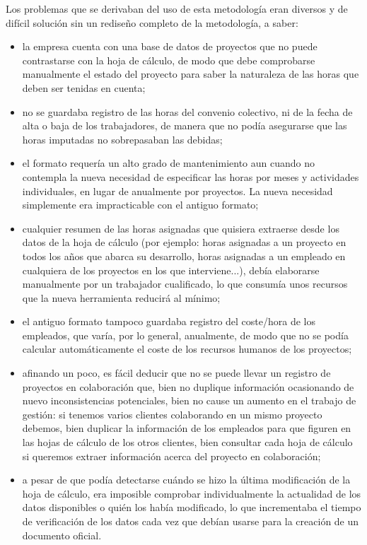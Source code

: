 Los problemas que se derivaban del uso de esta metodología eran diversos y de
difícil solución sin un rediseño completo de la metodología, a saber:
\begin{itemize}
\item la empresa cuenta con una base de datos de proyectos que no puede
contrastarse con la hoja de cálculo, de modo que debe comprobarse manualmente
el estado del proyecto para saber la naturaleza de las horas que deben ser
tenidas en cuenta;

\item no se guardaba registro de las horas del convenio colectivo, ni de la
fecha de alta o baja de los trabajadores, de manera que no podía asegurarse que
las horas imputadas no sobrepasaban las debidas;

\item el formato requería un alto grado de mantenimiento aun cuando no
contempla la nueva necesidad de especificar las horas por meses y actividades
individuales, en lugar de anualmente por proyectos. La nueva necesidad
simplemente era impracticable con el antiguo formato;

\item cualquier resumen de las horas asignadas que quisiera extraerse desde los
datos de la hoja de cálculo (por ejemplo: horas asignadas a un proyecto en
todos los años que abarca su desarrollo, horas asignadas a un empleado en
cualquiera de los proyectos en los que interviene...), debía elaborarse
manualmente por un trabajador cualificado, lo que consumía unos recursos que la
nueva herramienta reducirá al mínimo;

\item el antiguo formato tampoco guardaba registro del coste/hora de los
empleados, que varía, por lo general, anualmente, de modo que no se podía
calcular automáticamente el coste de los recursos humanos de los proyectos;

\item afinando un poco, es fácil deducir que no se puede llevar un registro de
proyectos en colaboración que, bien no duplique información ocasionando de nuevo
inconsistencias potenciales, bien no cause un aumento en el trabajo de
gestión: si tenemos varios clientes colaborando en un mismo proyecto debemos,
bien duplicar la información de los empleados para que figuren en las hojas de
cálculo de los otros clientes, bien consultar cada hoja de cálculo si
queremos extraer información acerca del proyecto en colaboración;

\item a pesar de que podía detectarse cuándo se hizo la última modificación de
la hoja de cálculo, era imposible comprobar individualmente la actualidad de los
datos disponibles o quién los había modificado, lo que incrementaba el tiempo de
verificación de los datos cada vez que debían usarse para la creación de un
documento oficial.
\end{itemize}

